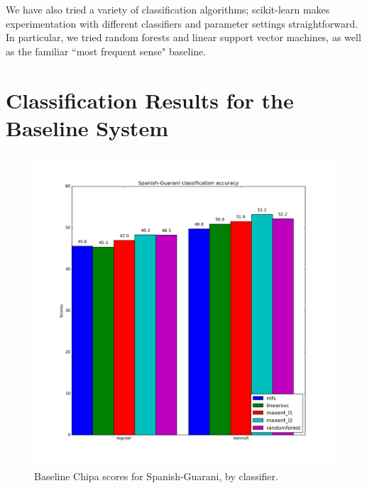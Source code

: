 We have also tried a variety of classification algorithms; scikit-learn makes
experimentation with different classifiers and parameter settings
straightforward. In particular, we tried random forests and linear support
vector machines, as well as the familiar ``most frequent sense" baseline.

\section{Classification Results for the Baseline System}

\begin{figure}
  \includegraphics[width=\textwidth]{baseline-esgn-ch4.png}
  \caption{Baseline Chipa scores for Spanish-Guarani, by classifier.}
  \label{fig:esgnresults:ch4}
\end{figure}

